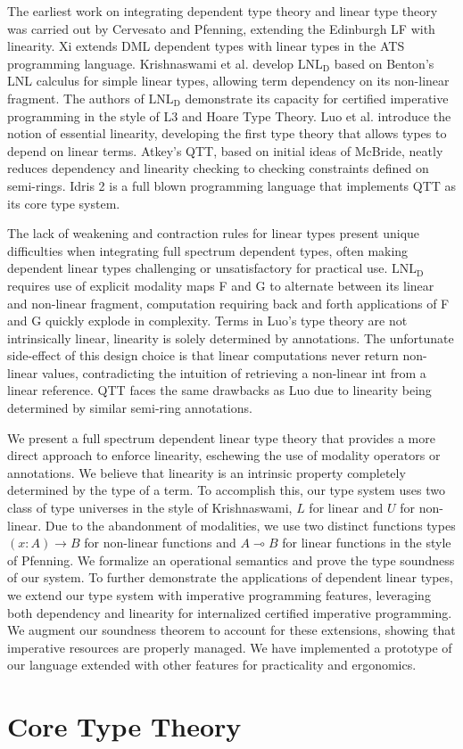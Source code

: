 \documentclass{article}
\newcommand{\LNLD}{\text{LNL}_\text{D}}
\begin{document}
  The earliest work on integrating dependent type theory and linear type theory was carried out by Cervesato and Pfenning, extending the Edinburgh LF with linearity. Xi extends DML dependent types with linear types in the ATS programming language. Krishnaswami et al. develop $\LNLD$ based on Benton's LNL calculus for simple linear types, allowing term dependency on its non-linear fragment. The authors of $\LNLD$ demonstrate its capacity for certified imperative programming in the style of L3 and Hoare Type Theory.  Luo et al. introduce the notion of essential linearity, developing the first type theory that allows types to depend on linear terms. Atkey's QTT, based on initial ideas of McBride, neatly reduces dependency and linearity checking to checking constraints defined on semi-rings. Idris 2 is a full blown programming language that implements QTT as its core type system.

  The lack of weakening and contraction rules for linear types present unique difficulties when integrating full spectrum dependent types, often making dependent linear types challenging or unsatisfactory for practical use. $\LNLD$ requires use of explicit modality maps F and G to alternate between its linear and non-linear fragment, computation requiring back and forth applications of F and G quickly explode in complexity. Terms in Luo's type theory are not intrinsically linear, linearity is solely determined by annotations. The unfortunate side-effect of this design choice is that linear computations never return non-linear values, contradicting the intuition of retrieving a non-linear int from a linear reference. QTT faces the same drawbacks as Luo due to linearity being determined by similar semi-ring annotations.
  
  We present a full spectrum dependent linear type theory that provides a more direct approach to enforce linearity, eschewing the use of modality operators or annotations. We believe that linearity is an intrinsic property completely determined by the type of a term. To accomplish this, our type system uses two class of type universes in the style of Krishnaswami, $L$ for linear and $U$ for non-linear. Due to the abandonment of modalities, we use two distinct functions types $(x : A) \rightarrow B$ for non-linear functions and $A \multimap B$ for linear functions in the style of Pfenning. We formalize an operational semantics and prove the type soundness of our system. To further demonstrate the applications of dependent linear types, we extend our type system with imperative programming features, leveraging both dependency and linearity for internalized certified imperative programming. We augment our soundness theorem to account for these extensions, showing that imperative resources are properly managed. We have implemented a prototype of our language extended with other features for practicality and ergonomics.

  \section{Core Type Theory}
\end{document}
